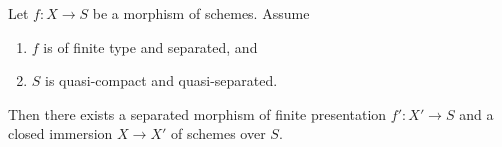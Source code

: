\begin{proposition}
\label{proposition-separated-closed-in-finite-presentation}
Let $f : X \to S$ be a morphism of schemes. Assume
\begin{enumerate}
\item $f$ is of finite type and separated, and
\item $S$ is quasi-compact and quasi-separated.
\end{enumerate}
Then there exists a separated morphism of finite presentation
$f' : X' \to S$ and a closed immersion $X \to X'$ of schemes over $S$.
\end{proposition}